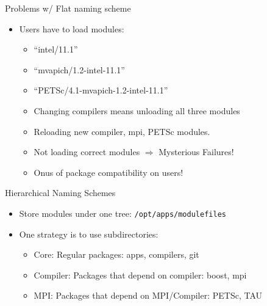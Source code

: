 \documentclass{beamer}
\begin{document}
\begin{frame}{Problems w/ Flat naming scheme}
  \begin{itemize}
    \item Users have to load modules:
      \begin{itemize}
        \item ``intel/11.1''
        \item ``mvapich/1.2-intel-11.1''
        \item ``PETSc/4.1-mvapich-1.2-intel-11.1''
        \item Changing compilers means unloading all three modules
        \item Reloading new compiler, mpi, PETSc modules.
        \item Not loading correct modules $\Rightarrow$ Mysterious Failures!
        \item Onus of package compatibility on users! 
      \end{itemize}
  \end{itemize}
\end{frame}


\begin{frame}{Hierarchical Naming Schemes}
  \begin{itemize}
    \item Store modules under one tree: \texttt{/opt/apps/modulefiles}
    \item One strategy is to use subdirectories:
      \begin{itemize}
        \item Core: Regular packages: apps, compilers, git
        \item Compiler: Packages that depend on compiler: boost, mpi
        \item MPI: Packages that depend on MPI/Compiler: PETSc, TAU
      \end{itemize}

  \end{itemize}
\end{frame}
\end{document}
